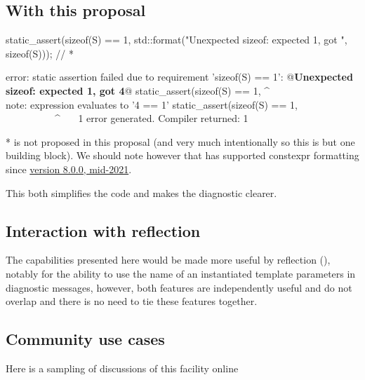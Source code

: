 \documentclass{wg21}
\begin{document}
\subsection{With this proposal}

\begin{colorblock}
static_assert(sizeof(S) == 1,
    std::format("Unexpected sizeof: expected 1, got {}", sizeof(S))); // *
\end{colorblock}

\begin{quoteblock}
\begin{codeblock}
error: static assertion failed due to requirement 'sizeof(S) == 1':
    @\textbf{Unexpected sizeof: expected 1, got 4}@
static_assert(sizeof(S) == 1,
^             ~~~~~~~~~~~~~~
note: expression evaluates to '4 == 1'
static_assert(sizeof(S) == 1,
~~~~~~~~~~^~~~
1 error generated.
Compiler returned: 1
\end{codeblock}
\end{quoteblock}

*  is not proposed in this proposal (and very much intentionally so this is but one building block).
We should note however that  has supported constexpr formatting since \href{https://github.com/fmtlib/fmt/releases}{version 8.0.0, mid-2021}.

This both simplifies the code and makes the diagnostic clearer.


\subsection{Interaction with reflection}

The capabilities presented here would be made more useful by reflection (), notably for the ability to use the name of an instantiated template parameters
in diagnostic messages, however, both features are independently useful and do not overlap and there is no need to tie these features together.

\subsection{Community use cases}

Here is a sampling of discussions of this facility online
\end{document}
